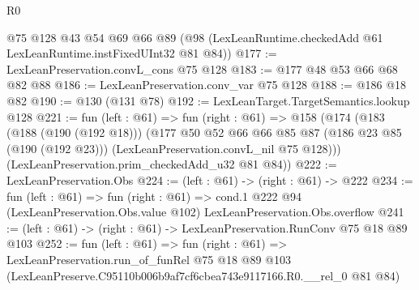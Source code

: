 \begin{lexlean}{R0}
\begin{coremodule}
    @75
    @128
    @43
    @54
    @69
    @66
    @89
    (@98 (LexLeanRuntime.checkedAdd @61 LexLeanRuntime.instFixedUInt32 @81 @84))
@177 := LexLeanPreservation.convL_cons @75 @128
@183 := @177 @48 @53 @66 @68 @82 @88
@186 := LexLeanPreservation.conv_var @75 @128
@188 := @186 @18 @82
@190 := @130 (@131 @78)
@192 := LexLeanTarget.TargetSemantics.lookup @128
@221 := fun (left : @61) =>
  fun (right : @61) =>
  @158
    (@174
      (@183
        (@188 (@190 (@192 @18)))
        (@177
          @50
          @52
          @66
          @66
          @85
          @87
          (@186 @23 @85 (@190 (@192 @23)))
          (LexLeanPreservation.convL_nil @75 @128)))
      (LexLeanPreservation.prim_checkedAdd_u32 @81 @84))
@222 := LexLeanPreservation.Obs
@224 := (left : @61) -> (right : @61) -> @222
@234 := fun (left : @61) =>
  fun (right : @61) =>
  cond.{1} @222 @94 (LexLeanPreservation.Obs.value @102) LexLeanPreservation.Obs.overflow
@241 := (left : @61) -> (right : @61) -> LexLeanPreservation.RunConv @75 @18 @89 @103
@252 := fun (left : @61) =>
  fun (right : @61) =>
  LexLeanPreservation.run_of_funRel
    @75
    @18
    @89
    @103
    (LexLeanPreserve.C95110b006b9af7cf6cbea743e9117166.R0.__rel_0 @81 @84)
\end{coremodule}
\end{lexlean}
